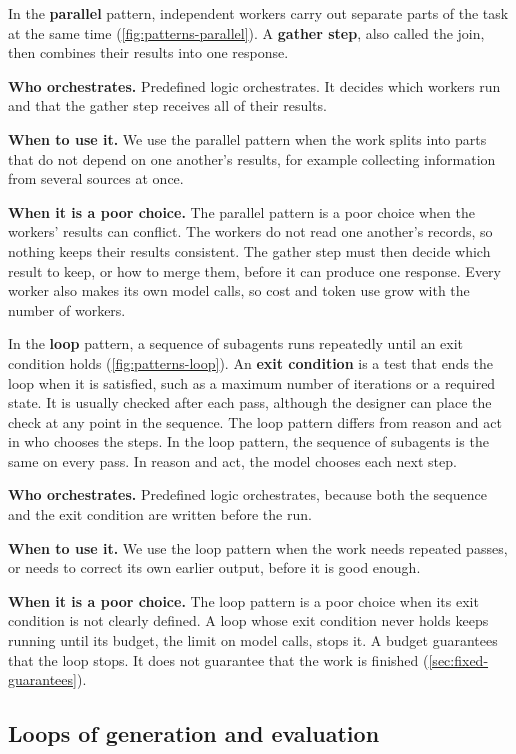 In the \textbf{parallel} pattern, independent workers carry out separate parts of the task at the
same time (\cref{fig:patterns-parallel}). A \textbf{gather step}, also called the join, then
combines their results into one response.
\bi
\item \textbf{Who orchestrates.} Predefined logic orchestrates. It decides which workers run and
that the gather step receives all of their results.
\item \textbf{When to use it.} We use the parallel pattern when the work splits into parts that do
not depend on one another's results, for example collecting information from several sources at
once.
\item \textbf{When it is a poor choice.} The parallel pattern is a poor choice when the workers'
results can conflict. The workers do not read one another's records, so nothing keeps their results
consistent. The gather step must then decide which result to keep, or how to merge them, before it
can produce one response. Every worker also makes its own model calls, so cost and token use grow
with the number of workers.
\ei

In the \textbf{loop} pattern, a sequence of subagents runs repeatedly until an exit condition holds
(\cref{fig:patterns-loop}). An \textbf{exit condition} is a test that ends the loop when it is
satisfied, such as a maximum number of iterations or a required state. It is usually checked after
each pass, although the designer can place the check at any point in the sequence. The loop pattern differs from reason and act in who chooses the
steps. In the loop pattern, the sequence of subagents is the same on every pass. In reason and act,
the model chooses each next step.
\bi
\item \textbf{Who orchestrates.} Predefined logic orchestrates, because both the sequence and the
exit condition are written before the run.
\item \textbf{When to use it.} We use the loop pattern when the work needs repeated passes, or needs
to correct its own earlier output, before it is good enough.
\item \textbf{When it is a poor choice.} The loop pattern is a poor choice when its exit condition
is not clearly defined. A loop whose exit condition never holds keeps running until its budget, the
limit on model calls, stops it. A budget guarantees that the loop stops. It does not guarantee that
the work is finished (\cref{sec:fixed-guarantees}).
\ei

\subsection{Loops of generation and evaluation}
\label{sec:patterns-review}

